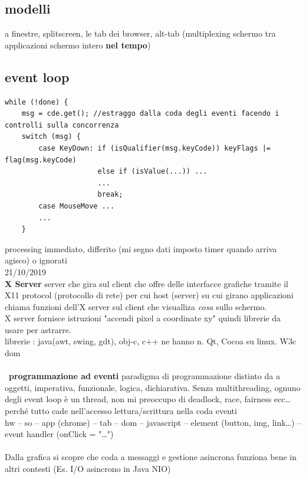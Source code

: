 \documentclass[10pt]{article}
\begin{document}
\subsection{modelli}
a finestre, splitscreen, le tab dei browser, alt-tab (multiplexing schermo tra applicazioni schermo intero \textbf{nel tempo})
\subsection{event loop}
\begin{verbatim}
while (!done) {
    msg = cde.get(); //estraggo dalla coda degli eventi facendo i controlli sulla concorrenza
    switch (msg) {
        case KeyDown: if (isQualifier(msg.keyCode)) keyFlags |= flag(msg.keyCode)
                      else if (isValue(...)) ...
                      ...
                      break;
        case MouseMove ...
        ...
    }		
\end{verbatim}
processing immediato, differito (mi segno dati imposto timer quando arriva agisco) o ignorati\\
21/10/2019\\
\textbf{X Server} server che gira sul client che offre delle interfacce grafiche tramite il X11 protocol (protocollo di rete) per cui host (server) su cui girano applicazioni chiama funzioni dell'X server sul client che visualliza \textit{cosa} sullo schermo.\\
X server fornisce istruzioni "accendi pixel a coordinate xy" quindi librerie da usare per astrarre.\\
librerie : java(awt, swing, gdt), obj-c, c++ ne hanno n. Qt, Cocoa su linux. W3c dom\\\\\
\textbf{programmazione ad eventi} paradigma di programmazione distinto da a oggetti, imperativa, funzionale, logica, dichiarativa. Senza multithreading, ognuno degli event loop è un thread, non mi preoccupo di deadlock, race, fairness ecc\ldots perché tutto cade nell'accesso lettura/scrittura nella coda eventi\\
hw -- so -- app (chrome) -- tab -- dom -- javascript -- element (button, img, link\ldots) -- event handler (onClick = "\ldots")\\\\
Dalla grafica si scopre che coda a messaggi e gestione asincrona funziona bene in altri contesti (Es. I/O asincrono in Java NIO)\\\\
\end{document}
